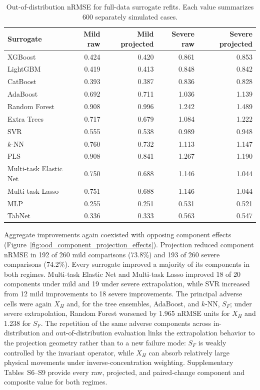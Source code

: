 \documentclass[a4paper,fleqn]{cas-sc}
\begin{document}
\FloatBarrier
\begin{table}[H]
\centering
\caption{Out-of-distribution nRMSE for full-data surrogate refits. Each value summarizes 600 separately simulated cases.}
\label{tab:ood_accuracy}
\scriptsize
\begin{tabular}{lrrrr}
\toprule
Surrogate & Mild raw & Mild projected & Severe raw & Severe projected \\
\midrule
XGBoost & 0.424 & 0.420 & 0.861 & 0.853 \\
LightGBM & 0.419 & 0.413 & 0.848 & 0.842 \\
CatBoost & 0.393 & 0.387 & 0.836 & 0.828 \\
AdaBoost & 0.692 & 0.711 & 1.036 & 1.139 \\
Random Forest & 0.908 & 0.996 & 1.242 & 1.489 \\
Extra Trees & 0.717 & 0.679 & 1.084 & 1.222 \\
SVR & 0.555 & 0.538 & 0.989 & 0.948 \\
$k$-NN & 0.760 & 0.732 & 1.113 & 1.147 \\
PLS & 0.908 & 0.841 & 1.267 & 1.190 \\
Multi-task Elastic Net & 0.750 & 0.688 & 1.146 & 1.044 \\
Multi-task Lasso & 0.751 & 0.688 & 1.146 & 1.044 \\
MLP & 0.255 & 0.251 & 0.531 & 0.521 \\
TabNet & 0.336 & 0.333 & 0.563 & 0.547 \\
\bottomrule
\end{tabular}
\end{table}
\FloatBarrier

Aggregate improvements again coexisted with opposing component effects (Figure~\ref{fig:ood_component_projection_effects}). Projection reduced component nRMSE in 192 of 260 mild comparisons (73.8\%) and 193 of 260 severe comparisons (74.2\%). Every surrogate improved a majority of its components in both regimes. Multi-task Elastic Net and Multi-task Lasso improved 18 of 20 components under mild and 19 under severe extrapolation, while SVR increased from 12 mild improvements to 18 severe improvements. The principal adverse cells were again $X_H$ and, for the tree ensembles, AdaBoost, and $k$-NN, $S_F$; under severe extrapolation, Random Forest worsened by 1.965 nRMSE units for $X_H$ and 1.238 for $S_F$. The repetition of the same adverse components across in-distribution and out-of-distribution evaluation links the extrapolation behavior to the projection geometry rather than to a new failure mode: $S_F$ is weakly controlled by the invariant operator, while $X_H$ can absorb relatively large physical movements under inverse-concentration weighting. Supplementary Tables~S6--S9 provide every raw, projected, and paired-change component and composite value for both regimes.
\end{document}
